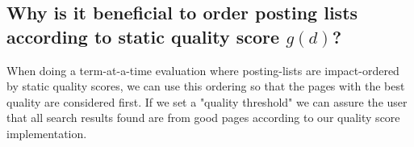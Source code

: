 \documentclass{article}
\begin{document}
	\subsection{Why is it beneficial to order posting lists according to static quality score $g(d)$?}
	When doing a term-at-a-time evaluation where posting-lists are impact-ordered by static quality scores, we can use this ordering so that the pages with the best quality are considered first. If we set a "quality threshold" we can assure the user that all search results found are from good pages according to our quality score implementation.
\end{document}
